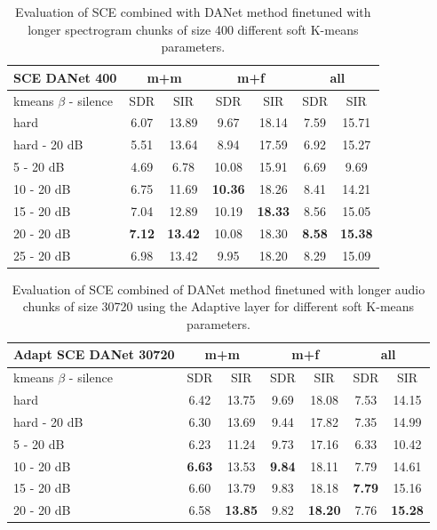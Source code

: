 \documentclass[master, tikz, final,11pt, dvipdfmx]{iscs-thesis}
\begin{document}
\begin{table}[h!]
\centering
\begin{tabular}{l|c|c|c|c|c|c}
SCE DANet 400 & \multicolumn{2}{c|}{m+m} & \multicolumn{2}{c|}{m+f} & \multicolumn{2}{c}{all} \\ 
\hline 
kmeans $\beta$ - silence & SDR & SIR & SDR & SIR & SDR & SIR \\ 
\hline
hard  & 6.07 & 13.89 & 9.67 & 18.14 & 7.59 & 15.71 \\ 
hard - 20 dB  & 5.51 & 13.64 & 8.94 & 17.59 & 6.92 & 15.27 \\
\hline
\hline
5 - 20 dB  & 4.69 & 6.78 & 10.08 & 15.91 & 6.69 & 9.69 \\ 
10 - 20 dB  & 6.75 & 11.69 & \cellcolor{green}\textbf{10.36} & \cellcolor{green}18.26  & 8.41 & 14.21 \\ 
15 - 20 dB & 7.04 & 12.89 & 10.19 & \textbf{18.33} & 8.56 & 15.05 \\ 
20 - 20 dB & \cellcolor{green}\textbf{7.12} & \cellcolor{green}\textbf{13.42} & 10.08 & 18.30 & \cellcolor{green}\textbf{8.58} & \cellcolor{green}\textbf{15.38} \\ 
25 - 20 dB & 6.98 & 13.42 & 9.95 & 18.20 & 8.29 & 15.09 \\ 
\end{tabular}
\caption[Evaluation of SCE combined with DANet method finetuned with longer spectrogram chunks of size 400]{Evaluation of SCE combined with DANet method finetuned with longer spectrogram chunks of size 400 different soft K-means parameters.}\label{table:SCEDANET400}
\end{table}

\begin{table}[h!]
\centering
\begin{tabular}{l|c|c|c|c|c|c}
Adapt SCE DANet 30720 & \multicolumn{2}{c|}{m+m} & \multicolumn{2}{c|}{m+f} & \multicolumn{2}{c}{all} \\ 
\hline 
kmeans $\beta$ - silence & SDR & SIR & SDR & SIR & SDR & SIR \\ 
\hline
hard & 6.42 & 13.75 & 9.69 & 18.08 & 7.53 & 14.15 \\ 
hard - 20 dB  & 6.30 & 13.69 & 9.44 & 17.82 & 7.35 & 14.99 \\
\hline
\hline
5 - 20 dB  & 6.23 & 11.24 & 9.73 & 17.16 & 6.33 & 10.42 \\ 
10 - 20 dB  & \cellcolor{green}\textbf{6.63} & \cellcolor{green}13.53 & \cellcolor{green}\textbf{9.84} & \cellcolor{green}18.11 & 7.79 & 14.61 \\ 
15 - 20 dB & 6.60 & 13.79 & 9.83 & 18.18 & \cellcolor{green}\textbf{7.79} & \cellcolor{green}15.16 \\ 
20 - 20 dB & 6.58 & \textbf{13.85} & 9.82 & \textbf{18.20} & 7.76 & \textbf{15.28} \\ 
\end{tabular}
\caption[Evaluation of SCE combined of DANet method finetuned with longer audio chunks of size 30720 using the Adaptive layer]{Evaluation of SCE combined of DANet method finetuned with longer audio chunks of size 30720 using the Adaptive layer for different soft K-means parameters.}
\label{table:AdaptSCEDANET400}
\end{table}
\end{document}
